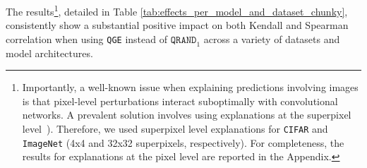 
The results\footnote{Importantly, a well-known issue when explaining predictions involving images is that pixel-level perturbations interact suboptimally with convolutional networks. A prevalent solution involves using explanations at the superpixel level~\cite{blücher2024decoupling}). Therefore, we used superpixel level explanations for \texttt{CIFAR} and \texttt{ImageNet} (4x4 and 32x32 superpixels, respectively). For completeness, the results for explanations at the pixel level are reported in the Appendix.}, detailed in Table \ref{tab:effects_per_model_and_dataset_chunky}, consistently show a substantial positive impact on both Kendall and Spearman correlation when using \texttt{QGE} instead of $\texttt{QRAND}_1$ across a variety of datasets and model architectures.

